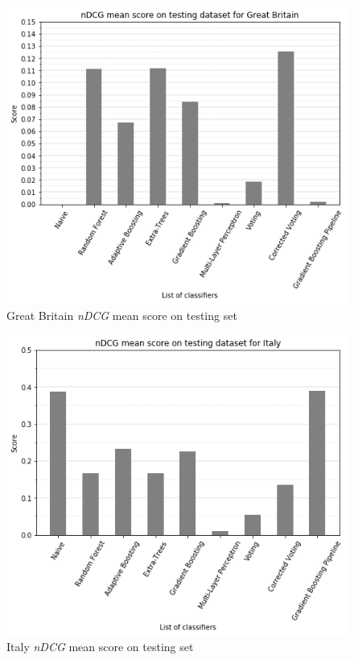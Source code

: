 \documentclass[twocolumn, switch]{article}
\begin{document}
\begin{figure}[H]
\centering
\includegraphics[scale=0.35]{../graphs/ndcg_mean_score_gb_test}
\caption{Great Britain \textit{nDCG} mean score on testing set}
\label{fig:ndcgtestgb}
\end{figure}

\begin{figure}[H]
\centering
\includegraphics[scale=0.35]{../graphs/ndcg_mean_score_it_test}
\caption{Italy \textit{nDCG} mean score on testing set}
\label{fig:ndcgtestit}
\end{figure}
\end{document}
